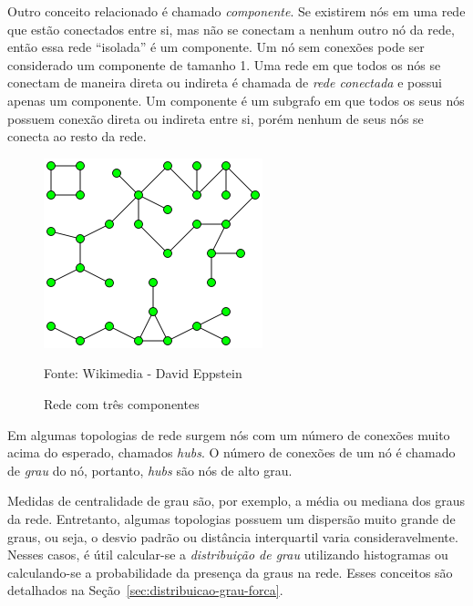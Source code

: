 \documentclass[12pt,a4paper,final]{article}
\newcommand{\source}[1]{\vspace{-10pt} \caption*{Fonte: {#1}} }
\begin{document}

Outro conceito relacionado é chamado \textit{componente}. Se existirem nós em uma rede que estão conectados entre si, mas não se conectam a nenhum outro nó da rede, então essa rede \enquote{isolada} é um componente. Um nó sem conexões pode ser considerado um componente de tamanho 1. Uma rede em que todos os nós se conectam de maneira direta ou indireta é chamada de \textit{rede conectada} e possui apenas um componente. Um componente é um subgrafo em que todos os seus nós possuem conexão direta ou indireta entre si, porém nenhum de seus nós se conecta ao resto da rede.


\begin{figure}[ht]
    \centering
    \includegraphics[scale=0.7]{componente.png}
    \caption{Rede com três componentes}
    \source{Wikimedia - David Eppstein}
    \label{fig:exemplo-componente}
\end{figure}

Em algumas topologias de rede surgem nós com um número de conexões muito acima do esperado, chamados \textit{hubs}. O número de conexões de um nó é chamado de \textit{grau} do nó, portanto, \textit{hubs} são nós de alto grau.

Medidas de centralidade de grau são, por exemplo, a média ou mediana dos graus da rede. Entretanto, algumas topologias possuem um dispersão muito grande de graus, ou seja, o desvio padrão ou distância interquartil varia consideravelmente. Nesses casos, é útil calcular-se a \textit{distribuição de grau} utilizando histogramas ou calculando-se a probabilidade da presença da graus na rede. Esses conceitos são detalhados na Seção~\ref{sec:distribuicao-grau-forca}.
\end{document}
